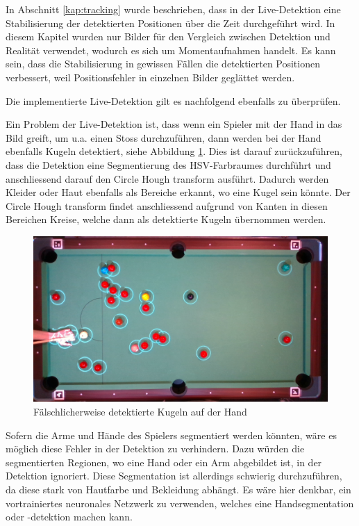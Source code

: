 In Abschnitt \ref{kap:tracking} wurde beschrieben, dass in der Live-Detektion eine Stabilisierung der detektierten Positionen
über die Zeit durchgeführt wird.
In diesem Kapitel wurden nur Bilder für den Vergleich zwischen Detektion und Realität verwendet, wodurch es sich um Momentaufnahmen handelt.
Es kann sein, dass die Stabilisierung in gewissen Fällen die detektierten Positionen verbessert,
weil Positionsfehler in einzelnen Bilder geglättet werden.

Die implementierte Live-Detektion gilt es nachfolgend ebenfalls zu überprüfen.

Ein Problem der Live-Detektion ist, dass wenn ein Spieler mit der Hand in das Bild greift, um u.a. einen Stoss
durchzuführen, dann werden bei der Hand ebenfalls Kugeln detektiert, siehe Abbildung \ref{fig:detection_hand_problem}.
Dies ist darauf zurückzuführen, dass die Detektion eine Segmentierung des HSV-Farbraumes durchführt\cite{project2:snooker_detection}
und anschliessend darauf den Circle Hough transform\cite{wiki:circle_hough} ausführt.
Dadurch werden Kleider oder Haut ebenfalls als Bereiche erkannt, wo eine Kugel sein könnte. Der Circle Hough transform
findet anschliessend aufgrund von Kanten in diesen Bereichen Kreise, welche dann als detektierte Kugeln übernommen werden.

\begin{figure}[h!]
    \begin{center}
        \includegraphics[width=0.8\linewidth]{../common/04_results/resources/detektierte_kugeln_auf_der_hand.png}
    \end{center}
    \caption{Fälschlicherweise detektierte Kugeln auf der Hand}
    \label{fig:detection_hand_problem}
\end{figure}

Sofern die Arme und Hände des Spielers segmentiert werden könnten, wäre es möglich diese Fehler in der Detektion zu verhindern.
Dazu würden die segmentierten Regionen, wo eine Hand oder ein Arm abgebildet ist, in der Detektion ignoriert.
Diese Segmentation ist allerdings schwierig durchzuführen, da diese stark von Hautfarbe und Bekleidung abhängt.
Es wäre hier denkbar, ein vortrainiertes neuronales Netzwerk zu verwenden, welches eine Handsegmentation oder -detektion machen kann.

